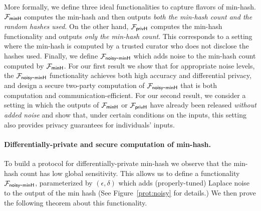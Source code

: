 More formally, we define three ideal functionalities to capture flavors of min-hash.  ${\mathcal{F}_\mathsf{minH}}$ computes the min-hash and then outputs \emph{both the min-hash count and the random hashes used}.  On the other hand, ${\mathcal{F}_\mathsf{privH}}$ computes the min-hash functionality and outputs 
\emph{only the min-hash count}.  This corresponds to a setting where the min-hash is computed by a trusted curator who does not disclose the hashes used.  Finally, we define ${\mathcal{F}_\mathsf{noisy\mbox{-}minH}}$ which adds noise to the min-hash count computed by ${\mathcal{F}_\mathsf{minH}}$.  For our first result we show that for appropriate noise levels, the ${\mathcal{F}_\mathsf{noisy\mbox{-}minH}}$ functionality achieves both high accuracy and differential privacy, and design a secure two-party computation of ${\mathcal{F}_\mathsf{noisy\mbox{-}minH}}$ that is both computation and communication-efficient.  For our second result, we consider a setting in which the outputs of ${\mathcal{F}_\mathsf{minH}}$ or ${\mathcal{F}_\mathsf{privH}}$ have already been released \emph{without added noise} and show that, under certain conditions on the inputs, this setting also provides privacy guarantees for individuals' inputs.
 




\paragraph{Differentially-private and secure computation of min-hash.}
To build a protocol for differentially-private min-hash we observe that the min-hash count has low global sensitivity.  This allows us to define a functionality ${\mathcal{F}_\mathsf{noisy\mbox{-}minH}}$, parameterized by $(\epsilon, \delta)$ which adds (properly-tuned) Laplace noise to the output of the min hash (See Figure~\ref{prot:noisy} for details.)  We then prove the following theorem about this functionality.

